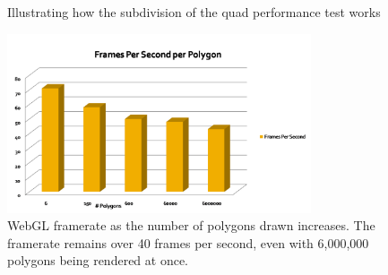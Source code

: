 \begin{figure}
  \centering
  \caption{Illustrating how the subdivision of the quad performance test works}
  \label{fig:webgl_perf}
\end{figure}

\begin{figure}
  \centering
  \includegraphics[width=0.8\textwidth]{images/webgl_perf_graph}
  \caption{WebGL framerate as the number of polygons drawn increases. The framerate remains over 40 frames per second, even with 6,000,000 polygons being rendered at once.}
  \label{fig:webgl_perf_graph}
\end{figure}
